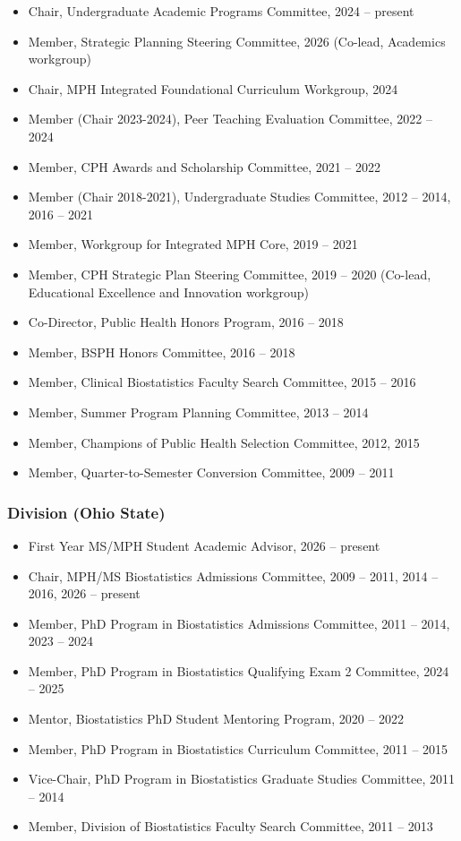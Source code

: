 \documentclass[
  english,
  letterpaper,
  DIV=11,
  numbers=noendperiod]{scrartcl}
\providecommand{\tightlist}{%
  \setlength{\itemsep}{0pt}\setlength{\parskip}{0pt}}
\begin{document}
\begin{itemize}
\tightlist
\item
  Chair, Undergraduate Academic Programs Committee, 2024 -- present
\item
  Member, Strategic Planning Steering Committee, 2026 (Co-lead,
  Academics workgroup)
\item
  Chair, MPH Integrated Foundational Curriculum Workgroup, 2024
\item
  Member (Chair 2023-2024), Peer Teaching Evaluation Committee, 2022 --
  2024
\item
  Member, CPH Awards and Scholarship Committee, 2021 -- 2022
\item
  Member (Chair 2018-2021), Undergraduate Studies Committee, 2012 --
  2014, 2016 -- 2021
\item
  Member, Workgroup for Integrated MPH Core, 2019 -- 2021
\item
  Member, CPH Strategic Plan Steering Committee, 2019 -- 2020 (Co-lead,
  Educational Excellence and Innovation workgroup)
\item
  Co-Director, Public Health Honors Program, 2016 -- 2018
\item
  Member, BSPH Honors Committee, 2016 -- 2018
\item
  Member, Clinical Biostatistics Faculty Search Committee, 2015 -- 2016
\item
  Member, Summer Program Planning Committee, 2013 -- 2014
\item
  Member, Champions of Public Health Selection Committee, 2012, 2015
\item
  Member, Quarter-to-Semester Conversion Committee, 2009 -- 2011
\end{itemize}

\subsubsection{Division (Ohio State)}\label{division-ohio-state}

\begin{itemize}
\tightlist
\item
  First Year MS/MPH Student Academic Advisor, 2026 -- present
\item
  Chair, MPH/MS Biostatistics Admissions Committee, 2009 -- 2011, 2014
  -- 2016, 2026 -- present
\item
  Member, PhD Program in Biostatistics Admissions Committee, 2011 --
  2014, 2023 -- 2024
\item
  Member, PhD Program in Biostatistics Qualifying Exam 2 Committee, 2024
  -- 2025
\item
  Mentor, Biostatistics PhD Student Mentoring Program, 2020 -- 2022
\item
  Member, PhD Program in Biostatistics Curriculum Committee, 2011 --
  2015
\item
  Vice-Chair, PhD Program in Biostatistics Graduate Studies Committee,
  2011 -- 2014
\item
  Member, Division of Biostatistics Faculty Search Committee, 2011 --
  2013
\end{itemize}
\end{document}
